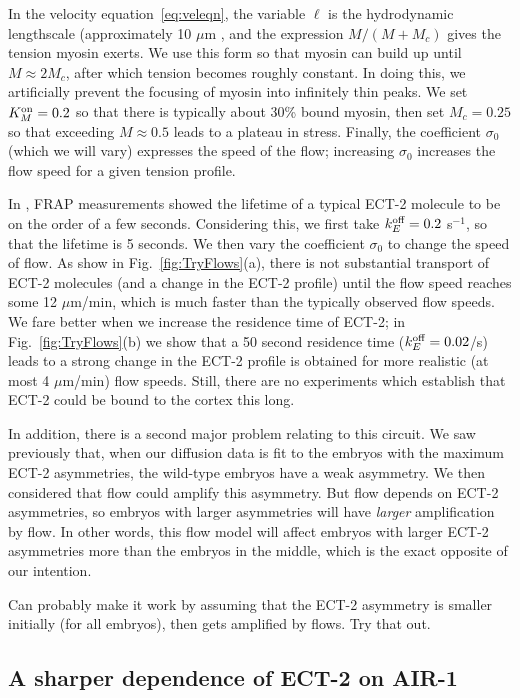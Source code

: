 \documentclass[11pt]{article}
\newcommand{\red}[1]{\color{red}#1\normalcolor}
\begin{document}
In the velocity equation\ \eqref{eq:veleqn}, the variable $\ell$ is the hydrodynamic lengthscale (approximately 10 $\mu$m \cite{mayer2010anisotropies}, and the expression $M/(M+M_c)$ gives the tension myosin exerts. We use this form so that myosin can build up until $M \approx 2 M_c$, after which tension becomes roughly constant. In doing this, we artificially prevent the focusing of myosin into infinitely thin peaks. We set $K^\text{on}_M=0.2$ so that there is typically about 30\% bound myosin, then set $M_c = 0.25$ so that exceeding $M \approx 0.5$ leads to a plateau in stress. Finally, the coefficient $\sigma_0$ (which we will vary) expresses the speed of the flow; increasing $\sigma_0$ increases the flow speed for a given tension profile.

In \cite{longhini2022aurora}, FRAP measurements showed the lifetime of a typical ECT-2 molecule to be on the order of a few seconds. Considering this, we first take $k^\text{off}_E=0.2$ s$^{-1}$, so that the lifetime is 5 seconds. We then vary the coefficient $\sigma_0$ to change the speed of flow. As show in Fig.\ \ref{fig:TryFlows}(a), there is not substantial transport of ECT-2 molecules (and a change in the ECT-2 profile) until the flow speed reaches some 12 $\mu$m/min, which is much faster than the typically observed flow speeds. We fare better when we increase the residence time of ECT-2; in Fig.\ \ref{fig:TryFlows}(b) we show that a 50 second residence time ($k^\text{off}_E=0.02$/s) leads to a strong change in the ECT-2 profile is obtained for more realistic (at most 4 $\mu$m/min) flow speeds. Still, there are no experiments which establish that ECT-2 could be bound to the cortex this long. 

In addition, there is a second major problem relating to this circuit. We saw previously that, when our diffusion data is fit to the embryos with the maximum ECT-2 asymmetries, the wild-type embryos have a weak asymmetry. We then considered that flow could amplify this asymmetry. But flow depends on ECT-2 asymmetries, so embryos with larger asymmetries will have \emph{larger} amplification by flow. In other words, this flow model will affect embryos with larger ECT-2 asymmetries more than the embryos in the middle, which is the exact opposite of our intention.

\red{Can probably make it work by assuming that the ECT-2 asymmetry is smaller initially (for all embryos), then gets amplified by flows. Try that out.}

\subsection{A sharper dependence of ECT-2 on AIR-1}
\end{document}
